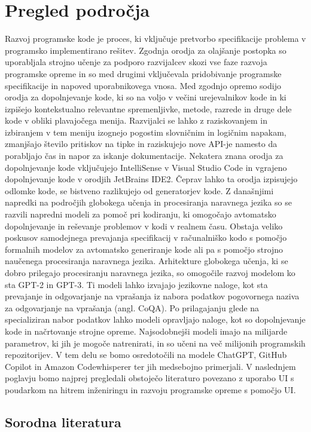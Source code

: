 \documentclass[12pt,a4paper]{book}
\begin{document}
\chapter{Pregled področja}
Razvoj programske kode je proces, ki vključuje pretvorbo specifikacije problema v programsko implementirano rešitev. Zgodnja orodja za olajšanje postopka so uporabljala strojno učenje za podporo razvijalcev skozi vse faze razvoja programske opreme in so med drugimi vključevala pridobivanje programske specifikacije in napoved uporabnikovega vnosa.
Med zgodnjo opremo sodijo orodja za dopolnjevanje kode, ki so na voljo v večini urejevalnikov kode in ki izpišejo kontekstualno relevantne spremenljivke, metode, razrede in druge dele kode v obliki plavajočega menija. Razvijalci se lahko z raziskovanjem in izbiranjem v tem meniju izognejo pogostim slovničnim in logičnim napakam, zmanjšajo število pritiskov na tipke in raziskujejo nove API-je namesto da porabljajo čas in napor za iskanje dokumentacije. Nekatera znana orodja za dopolnjevanje kode vključujejo IntelliSense v Visual Studio Code in vgrajeno dopolnjevanje kode v orodjih JetBrains IDE2. 
Čeprav lahko ta orodja izpisujejo odlomke kode, se bistveno razlikujejo od generatorjev kode.
Z današnjimi napredki na področjih globokega učenja in procesiranja naravnega jezika so se razvili napredni modeli za pomoč pri kodiranju, ki omogočajo avtomatsko dopolnjevanje in reševanje problemov v kodi v realnem času.
Obstaja veliko poskusov samodejnega prevajanja specifikacij v računalniško kodo s pomočjo formalnih modelov za avtomatsko generiranje kode ali pa s pomočjo strojno naučenega procesiranja naravnega jezika. Arhitekture globokega učenja, ki se dobro prilegajo procesiranju naravnega jezika, so omogočile razvoj modelom ko sta GPT-2 in GPT-3. Ti modeli lahko izvajajo jezikovne naloge, kot sta prevajanje in odgovarjanje na vprašanja iz nabora podatkov pogovornega naziva za odgovarjanje na vprašanja (angl. CoQA). Po prilagajanju glede na specializiran nabor podatkov lahko modeli opravljajo naloge, kot so dopolnjevanje kode in načrtovanje strojne opreme.  Najsodobnejši modeli imajo na milijarde parametrov, ki jih je mogoče natrenirati, in so učeni na več milijonih programskih repozitorijev. V tem delu se bomo osredotočili na modele ChatGPT, GitHub Copilot in Amazon Codewhisperer ter jih medsebojno primerjali.
V naslednjem poglavju bomo najprej pregledali obstoječo literaturo povezano z uporabo UI s poudarkom na hitrem inženiringu in razvoju programske opreme s pomočjo UI. 
\cite{zhang2003machine}
\section{Sorodna literatura}
\end{document}

